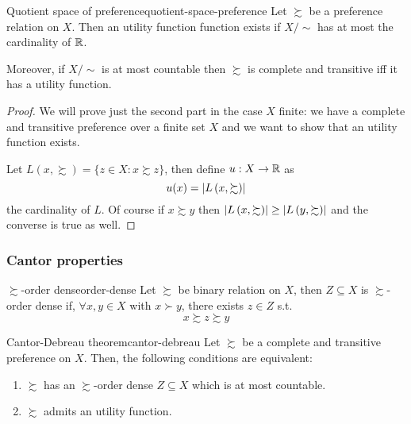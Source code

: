 \documentclass[12pt]{extarticle}
\begin{document}
\begin{theorem}{Quotient space of preference}{quotient-space-preference}
    Let $\succsim$ be a preference relation on $X$. Then an utility function function exists if $X/\sim$ has at most the cardinality of $\mathbb{R}$.

    Moreover, if $X / \sim$ is at most countable then $\succsim$ is complete and transitive iff it has a utility function.
\end{theorem}

\begin{proof}
    We will prove just the second part in the case $X$ finite: we have a complete and transitive preference over a finite set $X$ and we want to show that an utility function exists.

    Let $L(x, \succsim) = \{ z \in X : x \succsim z \}$, then define $u: X \to \mathbb{R}$ as
    \begin{equation}
        u(x) = \abs{L\left(x, \succsim\right)}
    \end{equation}
    the cardinality of $L$.
    Of course if $x \succsim y$ then $\abs{L\left(x, \succsim\right)} \geq \abs{L\left(y, \succsim\right)}$ and the converse is true as well.
\end{proof}

\subsubsection{Cantor properties}

\begin{definition}{$\succsim$-order dense}{order-dense}
    Let $\succsim$ be binary relation on $X$, then $Z \subseteq X$ is $\succsim$-order dense if, $\forall x, y \in X$ with $x \succ y$, there exists $z \in Z$ s.t.
    \begin{equation}
        x \succsim z \succsim y
    \end{equation}
\end{definition}

\begin{theorem}{Cantor-Debreau theorem}{cantor-debreau}
    Let $\succsim$ be a complete and transitive preference on $X$.
    Then, the following conditions are equivalent:
    \begin{enumerate}[label=\roman*.]
        \item $\succsim$ has an $\succsim$-order dense $Z \subseteq X$ which is at most countable.
        \item $\succsim$ admits an utility function.
    \end{enumerate}
\end{theorem}
\end{document}
